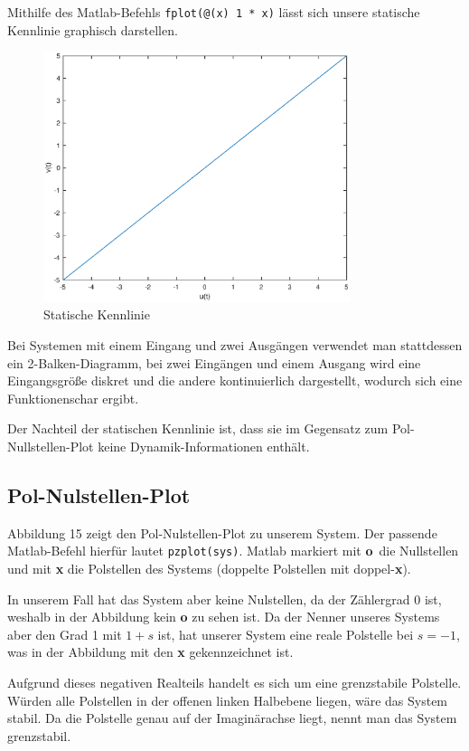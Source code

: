 Mithilfe des Matlab-Befehls \texttt{fplot(@(x) 1 * x)} lässt sich unsere statische Kennlinie graphisch darstellen. 

\begin{figure}[H]
    \label{fig:staticCurve}
    \centering
    \includegraphics[width=0.8\textwidth]{Bilder/StaticCurvePT1Tt.eps}
    \caption{Statische Kennlinie}
 \end{figure}

Bei Systemen mit einem Eingang und zwei Ausgängen verwendet man stattdessen ein 2-Balken-Diagramm, bei zwei Eingängen und einem Ausgang wird eine Eingangsgröße diskret und die andere kontinuierlich dargestellt, wodurch sich eine Funktionenschar ergibt. 

Der Nachteil der statischen Kennlinie ist, dass sie im Gegensatz zum Pol-Nullstellen-Plot keine Dynamik-Informationen enthält.

\subsection{Pol-Nulstellen-Plot}
Abbildung 15 zeigt den Pol-Nulstellen-Plot zu unserem System. Der passende Matlab-Befehl hierfür lautet \texttt{pzplot(sys)}. Matlab markiert mit \textbf{o} die Nullstellen und mit \textbf{x} die Polstellen des Systems (doppelte Polstellen mit doppel-\textbf{x}).

In unserem Fall hat das System aber keine Nulstellen, da der Zählergrad 0 ist, weshalb in der Abbildung kein \textbf{o} zu sehen ist. Da der Nenner unseres Systems aber den Grad 1 mit $1 + s$ ist, hat unserer System eine reale Polstelle bei $s = -1$, was in der Abbildung mit den \textbf{x} gekennzeichnet ist. 

Aufgrund dieses negativen Realteils handelt es sich um eine grenzstabile Polstelle. Würden alle Polstellen in der offenen linken Halbebene liegen, wäre das System stabil. Da die Polstelle genau auf der Imaginärachse liegt, nennt man das System grenzstabil.

